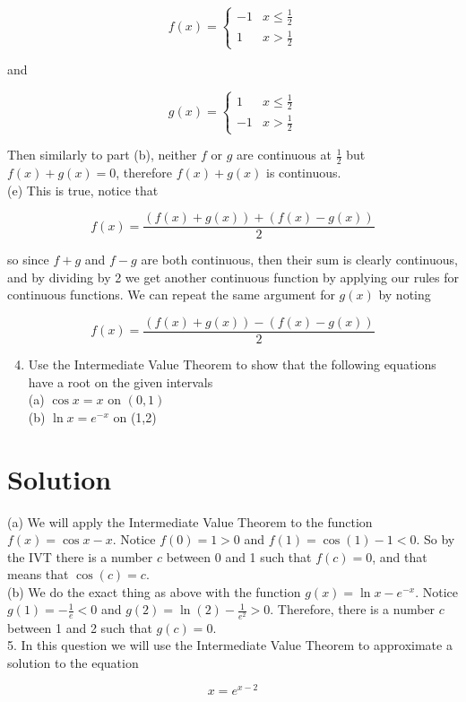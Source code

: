 \documentclass[10pt]{article}
\begin{document}
$$
f(x)= \begin{cases}-1 & x \leq \frac{1}{2} \\ 1 & x>\frac{1}{2}\end{cases}
$$

and

$$
g(x)= \begin{cases}1 & x \leq \frac{1}{2} \\ -1 & x>\frac{1}{2}\end{cases}
$$

Then similarly to part (b), neither $f$ or $g$ are continuous at $\frac{1}{2}$ but $f(x)+g(x)=0$, therefore $f(x)+g(x)$ is continuous.\\
(e) This is true, notice that

$$
f(x)=\frac{(f(x)+g(x))+(f(x)-g(x))}{2}
$$

so since $f+g$ and $f-g$ are both continuous, then their sum is clearly continuous, and by dividing by 2 we get another continuous function by applying our rules for continuous functions. We can repeat the same argument for $g(x)$ by noting

$$
f(x)=\frac{(f(x)+g(x))-(f(x)-g(x))}{2}
$$

\begin{enumerate}
  \setcounter{enumi}{3}
  \item Use the Intermediate Value Theorem to show that the following equations have a root on the given intervals\\
(a) $\cos x=x$ on $(0,1)$\\
(b) $\ln x=e^{-x}$ on (1,2)
\end{enumerate}

\section*{Solution}
(a) We will apply the Intermediate Value Theorem to the function $f(x)=\cos x-x$. Notice $f(0)=1>0$ and $f(1)=\cos (1)-1<0$. So by the IVT there is a number $c$ between 0 and 1 such that $f(c)=0$, and that means that $\cos (c)=c$.\\
(b) We do the exact thing as above with the function $g(x)=\ln x-e^{-x}$. Notice $g(1)=-\frac{1}{e}<0$ and $g(2)=\ln (2)-\frac{1}{e^{2}}>0$. Therefore, there is a number $c$ between 1 and 2 such that $g(c)=0$.\\
5. In this question we will use the Intermediate Value Theorem to approximate a solution to the equation

$$
x=e^{x-2}
$$
\end{document}
